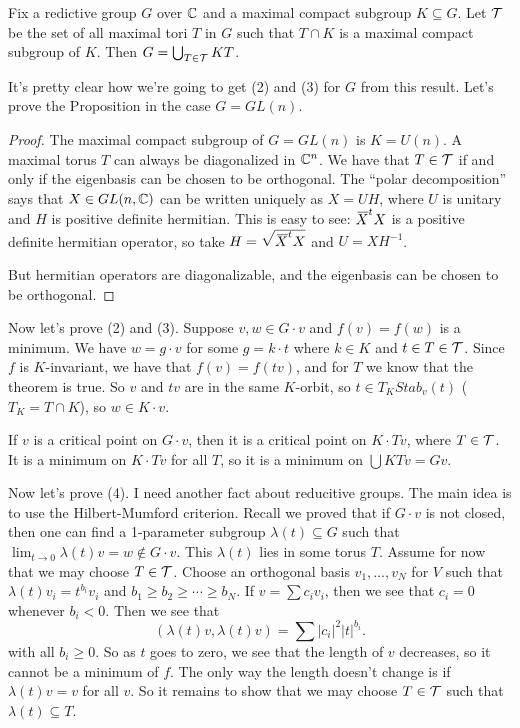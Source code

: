 \begin{proposition}
 Fix a redictive group $G$ over $\mathbb{C}$ and a maximal compact subgroup $K\subseteq G$. Let $\mathcal{T}$ be the set of all maximal tori $T$ in $G$ such that $T\cap K$ is a maximal compact subgroup of $K$. Then $G=\bigcup_{T\in \mathcal{T}}KT$.
\end{proposition}
It's pretty clear how we're going to get (2) and (3) for $G$ from this result. Let's prove the Proposition in the case $G=GL(n)$.
\begin{proof}
 The maximal compact subgroup of $G=GL(n)$ is $K=U(n)$. A maximal torus $T$ can always be diagonalized in $\mathbb{C}^n$. We have that $T\in\mathcal{T}$ if and only if the eigenbasis can be chosen to be orthogonal. The ``polar decomposition'' says that $X\in GL(n,\mathbb{C})$ can be written uniquely as $X=UH$, where $U$ is unitary and $H$ is positive definite hermitian. This is easy to see: $\bbar X^t X$ is a positive definite hermitian operator, so take $H=\sqrt{\bbar X^t X}$ and $U=XH^{-1}$.
 
 But hermitian operators are diagonalizable, and the eigenbasis can be chosen to be orthogonal.
\end{proof}
Now let's prove (2) and (3). Suppose $v,w\in G\cdot v$ and $f(v)=f(w)$ is a minimum. We have $w=g\cdot v$ for some $g=k\cdot t$ where $k\in K$ and $t\in T\in \mathcal{T}$. Since $f$ is $K$-invariant, we have that $f(v)=f(tv)$, and for $T$ we know that the theorem is true. So $v$ and $tv$ are in the same $K$-orbit, so $t\in T_K Stab_v(t)$ ($T_K=T\cap K$), so $w\in K\cdot v$.

If $v$ is a critical point on $G\cdot v$, then it is a critical point on $K\cdot Tv$, where $T\in \mathcal{T}$. It is a minimum on $K\cdot Tv$ for all $T$, so it is a minimum on $\bigcup KTv=Gv$.

Now let's prove (4). I need another fact about reducitive groups. The main idea is to use the Hilbert-Mumford criterion. Recall we proved that if $G\cdot v$ is not closed, then one can find a 1-parameter subgroup $\lambda(t)\subseteq G$ such that $\lim_{t\to 0}\lambda(t)v=w\not\in G\cdot v$. This $\lambda(t)$ lies in some torus $T$. Assume for now that we may choose $T\in \mathcal{T}$. Choose an orthogonal basis $v_1,\dots, v_N$ for $V$ such that $\lambda(t)v_i=t^{b_i}v_i$ and $b_1\ge b_2\ge\cdots\ge b_N$. If $v=\sum c_i v_i$, then we see that $c_i=0$ whenever $b_i<0$. Then we see that
\[
 (\lambda(t)v,\lambda(t)v) = \sum |c_i|^2|t|^{b_i}.
\]
with all $b_i\ge 0$. So as $t$ goes to zero, we see that the length of $v$ decreases, so it cannot be a minimum of $f$. The only way the length doesn't change is if $\lambda(t)v=v$ for all $v$. So it remains to show that we may choose $T\in \mathcal{T}$ such that $\lambda(t)\subseteq T$.

